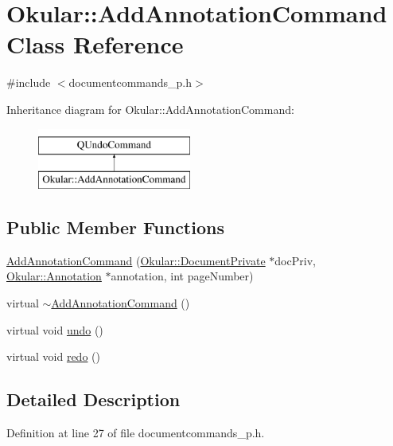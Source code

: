 \hypertarget{classOkular_1_1AddAnnotationCommand}{\section{Okular\+:\+:Add\+Annotation\+Command Class Reference}
\label{classOkular_1_1AddAnnotationCommand}
}


{\ttfamily \#include $<$documentcommands\+\_\+p.\+h$>$}

Inheritance diagram for Okular\+:\+:Add\+Annotation\+Command\+:\begin{figure}[H]
\begin{center}
\leavevmode
\includegraphics[height=2.000000cm]{classOkular_1_1AddAnnotationCommand}
\end{center}
\end{figure}
\subsection*{Public Member Functions}
\begin{DoxyCompactItemize}
\item 
\hyperlink{classOkular_1_1AddAnnotationCommand_ac6f174c03e464a1643dbbe84d475d7bd}{Add\+Annotation\+Command} (\hyperlink{classOkular_1_1DocumentPrivate}{Okular\+::\+Document\+Private} $\ast$doc\+Priv, \hyperlink{classOkular_1_1Annotation}{Okular\+::\+Annotation} $\ast$annotation, int page\+Number)
\item 
virtual \hyperlink{classOkular_1_1AddAnnotationCommand_a7709ffeee8cccd75fd78e6393b66fa9e}{$\sim$\+Add\+Annotation\+Command} ()
\item 
virtual void \hyperlink{classOkular_1_1AddAnnotationCommand_ab9edaaacd8989de3fd9cd8cf246fbcaf}{undo} ()
\item 
virtual void \hyperlink{classOkular_1_1AddAnnotationCommand_ab6c194cc1f7877acf9c9f197a24f2ae5}{redo} ()
\end{DoxyCompactItemize}


\subsection{Detailed Description}


Definition at line 27 of file documentcommands\+\_\+p.\+h.



